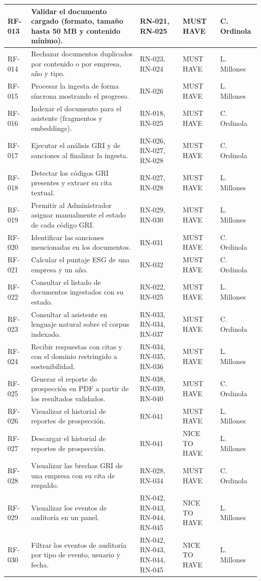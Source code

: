 \begin{longtable}{|C{1.2cm}|L{6.4cm}|L{3.1cm}|C{1.6cm}|C{1.8cm}|}
\hline
RF-013 & Validar el documento cargado (formato, tamaño hasta 50 MB y contenido mínimo). & RN-021, RN-025 & MUST HAVE & C. Ordinola \\
\hline
RF-014 & Rechazar documentos duplicados por contenido o por empresa, año y tipo. & RN-023, RN-024 & MUST HAVE & L. Millones \\
\hline
RF-015 & Procesar la ingesta de forma síncrona mostrando el progreso. & RN-026 & MUST HAVE & L. Millones \\
\hline
RF-016 & Indexar el documento para el asistente (fragmentos y embeddings). & RN-018, RN-025 & MUST HAVE & C. Ordinola \\
\hline
RF-017 & Ejecutar el análisis GRI y de sanciones al finalizar la ingesta. & RN-026, RN-027, RN-028 & MUST HAVE & C. Ordinola \\
\hline
RF-018 & Detectar los códigos GRI presentes y extraer su cita textual. & RN-027, RN-028 & MUST HAVE & L. Millones \\
\hline
RF-019 & Permitir al Administrador asignar manualmente el estado de cada código GRI. & RN-029, RN-030 & MUST HAVE & L. Millones \\
\hline
RF-020 & Identificar las sanciones mencionadas en los documentos. & RN-031 & MUST HAVE & C. Ordinola \\
\hline
RF-021 & Calcular el puntaje ESG de una empresa y un año. & RN-032 & MUST HAVE & C. Ordinola \\
\hline
RF-022 & Consultar el listado de documentos ingestados con su estado. & RN-022, RN-025 & MUST HAVE & L. Millones \\
\hline
RF-023 & Consultar al asistente en lenguaje natural sobre el corpus indexado. & RN-033, RN-034, RN-037 & MUST HAVE & C. Ordinola \\
\hline
RF-024 & Recibir respuestas con citas y con el dominio restringido a sostenibilidad. & RN-034, RN-035, RN-036 & MUST HAVE & L. Millones \\
\hline
RF-025 & Generar el reporte de prospección en PDF a partir de los resultados validados. & RN-038, RN-039, RN-040 & MUST HAVE & C. Ordinola \\
\hline
RF-026 & Visualizar el historial de reportes de prospección. & RN-041 & MUST HAVE & L. Millones \\
\hline
RF-027 & Descargar el historial de reportes de prospección. & RN-041 & NICE TO HAVE & L. Millones \\
\hline
RF-028 & Visualizar las brechas GRI de una empresa con su cita de respaldo. & RN-028, RN-034 & MUST HAVE & C. Ordinola \\
\hline
RF-029 & Visualizar los eventos de auditoría en un panel. & RN-042, RN-043, RN-044, RN-045 & NICE TO HAVE & L. Millones \\
\hline
RF-030 & Filtrar los eventos de auditoría por tipo de evento, usuario y fecha. & RN-042, RN-043, RN-044, RN-045 & NICE TO HAVE & L. Millones \\
\hline
\end{longtable}
